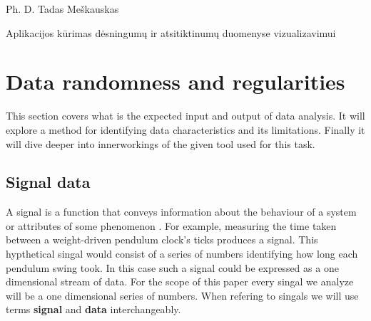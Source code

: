 \documentclass[a4paper,12pt,fleqn]{article}
\begin{document}
{}{}{}{}%
{Ph. D. Tadas Meškauskas}

\tableofcontents



\bothabstracts{}%
{Aplikacijos kūrimas dėsningumų ir atsitiktinumų duomenyse vizualizavimui} %
{}%




\newpage


\section{Data randomness and regularities}
This section covers what is the expected input and output of data analysis.
It will explore a method for identifying data characteristics and its limitations.
Finally it will dive deeper into innerworkings of the given tool used for this task.


\subsection{Signal data}
A signal is a function that conveys information about the behaviour of a system or attributes of some phenomenon \cite{priemer1990introductory}.
For example, measuring the time taken between a weight-driven
pendulum clock's ticks produces a signal.
This hypthetical singal would consist of a series of numbers identifying how long each pendulum swing took.
In this case such a signal could be expressed as a one dimensional stream of data.
For the scope of this paper every singal we analyze will be a one dimensional series of numbers.
When refering to singals we will use terms \textbf{signal} and \textbf{data} interchangeably.
\end{document}
